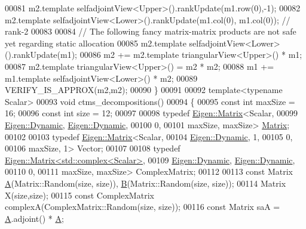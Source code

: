 \begin{DoxyCode}
00081   m2.template selfadjointView<Upper>().rankUpdate(m1.row(0),-1);
00082   m2.template selfadjointView<Lower>().rankUpdate(m1.col(0), m1.col(0)); \textcolor{comment}{// rank-2}
00083 
00084   \textcolor{comment}{// The following fancy matrix-matrix products are not safe yet regarding static allocation}
00085   m2.template selfadjointView<Lower>().rankUpdate(m1);
00086   m2 += m2.template triangularView<Upper>() * m1;
00087   m2.template triangularView<Upper>() = m2 * m2;
00088   m1 += m1.template selfadjointView<Lower>() * m2;
00089   VERIFY\_IS\_APPROX(m2,m2);
00090 \}
00091 
00092 \textcolor{keyword}{template}<\textcolor{keyword}{typename} Scalar>
00093 \textcolor{keywordtype}{void} ctms\_decompositions()
00094 \{
00095   \textcolor{keyword}{const} \textcolor{keywordtype}{int} maxSize = 16;
00096   \textcolor{keyword}{const} \textcolor{keywordtype}{int} size    = 12;
00097 
00098   \textcolor{keyword}{typedef} \hyperlink{group___core___module_class_eigen_1_1_matrix}{Eigen::Matrix}<Scalar,
00099                         \hyperlink{namespace_eigen_ad81fa7195215a0ce30017dfac309f0b2}{Eigen::Dynamic}, \hyperlink{namespace_eigen_ad81fa7195215a0ce30017dfac309f0b2}{Eigen::Dynamic},
00100                         0,
00101                         maxSize, maxSize> \hyperlink{group___core___module_class_eigen_1_1_matrix}{Matrix};
00102 
00103   \textcolor{keyword}{typedef} \hyperlink{group___core___module_class_eigen_1_1_matrix}{Eigen::Matrix}<Scalar,
00104                         \hyperlink{namespace_eigen_ad81fa7195215a0ce30017dfac309f0b2}{Eigen::Dynamic}, 1,
00105                         0,
00106                         maxSize, 1> Vector;
00107 
00108   \textcolor{keyword}{typedef} \hyperlink{group___core___module_class_eigen_1_1_matrix}{Eigen::Matrix<std::complex<Scalar>},
00109                         \hyperlink{namespace_eigen_ad81fa7195215a0ce30017dfac309f0b2}{Eigen::Dynamic}, \hyperlink{namespace_eigen_ad81fa7195215a0ce30017dfac309f0b2}{Eigen::Dynamic},
00110                         0,
00111                         maxSize, maxSize> ComplexMatrix;
00112 
00113   \textcolor{keyword}{const} Matrix \hyperlink{group___core___module_class_eigen_1_1_matrix}{A}(Matrix::Random(size, size)), \hyperlink{group___core___module_class_eigen_1_1_matrix}{B}(Matrix::Random(size, size));
00114   Matrix X(size,size);
00115   \textcolor{keyword}{const} ComplexMatrix complexA(ComplexMatrix::Random(size, size));
00116   \textcolor{keyword}{const} Matrix saA = \hyperlink{group___core___module_class_eigen_1_1_matrix}{A}.adjoint() * \hyperlink{group___core___module_class_eigen_1_1_matrix}{A};

\end{DoxyCode}
